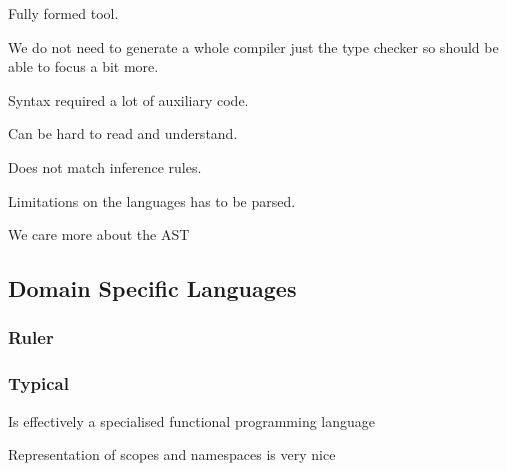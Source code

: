 Fully formed tool.

We do not need to generate a whole compiler just the type checker so should be able to focus a bit more.

Syntax required a lot of auxiliary code.

Can be hard to read and understand.

Does not match inference rules.

Limitations on the languages has to be parsed.

We care more about the AST

\subsection{Domain Specific Languages}
\subsubsection{Ruler}
\subsubsection{Typical}
Is effectively a specialised functional programming language

Representation of scopes and namespaces is very nice